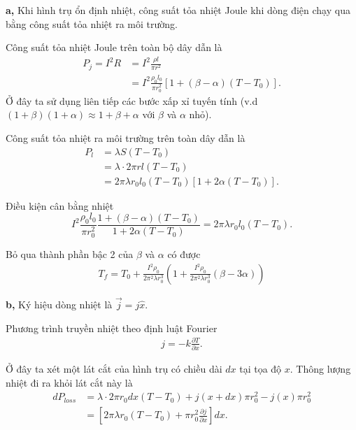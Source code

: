 \textbf{a,}
Khi hình trụ ổn định nhiệt, công suất tỏa nhiệt Joule khi dòng điện chạy qua bằng công suất tỏa nhiệt ra môi trường.


Công suất tỏa nhiệt Joule trên toàn bộ dây dẫn là
\begin{equation} \label{eq1_p2_d2}
\begin{split}
P_j = I^2 R &= I^2 \frac{\rho l}{\pi r^2}\\
&= I^2 \frac{\rho_0 l_0}{\pi r_0^2} [1 + (\beta - \alpha) (T-T_0)].
\end{split}
\end{equation}
Ở đây ta sử dụng liên tiếp các bước xấp xỉ tuyến tính (v.d $(1 + \beta)(1 + \alpha) \approx 1 + \beta+\alpha$ với $\beta$ và $\alpha$ nhỏ).


Công suất tỏa nhiệt ra môi trường trên toàn dây dẫn là
\begin{equation} \label{eq2_p2_d2}
\begin{split}
P_l &= \lambda S (T-T_0)\\
&= \lambda \cdot 2\pi rl (T-T_0)\\
&= 2\pi\lambda r_0 l_0 (T-T_0) [1 + 2\alpha (T - T_0)].
\end{split}
\end{equation}

Điều kiện cân bằng nhiệt
\begin{equation} \label{eq3_p2_d2}
I^2 \frac{\rho_0 l_0}{\pi r_0^2}\frac{1 + (\beta - \alpha)(T-T_0)}{1 + 2\alpha (T-T_0)} = 2\pi\lambda r_0 l_0 (T-T_0).
\end{equation}

Bỏ qua thành phần bậc 2 của $\beta$ và $\alpha$ có được
\begin{align} \label{eq4_p2_d2}
T_f = T_0 + \frac{I^2 \rho_0}{2\pi^2 \lambda r_0^3} \left(1 + \frac{I^2 \rho_0}{2\pi^2 \lambda r_0^3} (\beta - 3 \alpha) \right)
\end{align}

\textbf{b, }
Ký hiệu dòng nhiệt là $\vec{j} = j \hat{x}$.

Phương trình truyền nhiệt theo định luật Fourier
\begin{align}
j = - k \frac{\partial T}{\partial x}.
\end{align}

Ở đây ta xét một lát cắt của hình trụ có chiều dài $dx$ tại tọa độ $x$.
Thông lượng nhiệt đi ra khỏi lát cắt này là
\begin{equation} \label{eq5_p2_d2}
\begin{split}
d P_{loss} &= \lambda \cdot 2\pi r_0 d x (T - T_0) + j(x + dx) \pi r_0^2 - j(x) \pi r_0^2\\
&= \left[2\pi\lambda r_0 (T-T_0) + \pi r_0^2 \frac{\partial j}{\partial x}\right] dx.
\end{split}
\end{equation}

